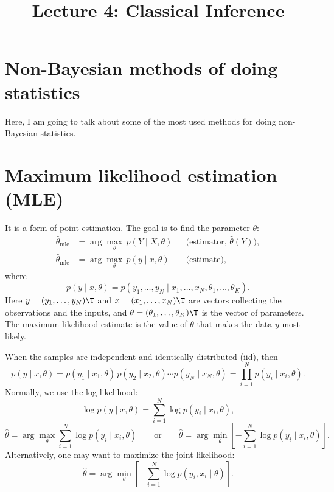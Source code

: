 
\title{Lecture 4: Classical Inference}
\author{}\date{}


\maketitle

\section*{Non-Bayesian methods of doing statistics}
Here, I am going to talk about some of the most used methods for doing non-Bayesian statistics.

\section{Maximum likelihood estimation (MLE)}
It is a form of point estimation. The goal is to find the parameter $\theta$:
\begin{align*}
\hat\theta_{\text{mle}} &= \arg\max_{\theta}\, p(Y \mid X, \theta) && \text{(estimator, } \hat\theta(Y)\text{)},\\
\hat\theta_{\text{mle}} &= \arg\max_{\theta}\, p(y \mid x, \theta) && \text{(estimate)},
\end{align*}
where
\[
p(y \mid x, \theta) = p(y_1, \dots, y_N \mid x_1, \dots, x_N, \theta_1, \dots, \theta_K).
\]
Here $y = (y_1, \dots, y_N)\T$ and $x = (x_1, \dots, x_N)\T$ are vectors collecting the observations and the inputs, and $\theta = (\theta_1, \dots, \theta_K)\T$ is the vector of parameters.
The maximum likelihood estimate is the value of $\theta$ that makes the data $y$ most likely.

When the samples are independent and identically distributed (iid), then
\[
p(y \mid x, \theta) = p(y_1 \mid x_1, \theta)\,p(y_2 \mid x_2, \theta)\cdots p(y_N \mid x_N, \theta) = \prod_{i=1}^{N} p(y_i \mid x_i, \theta).
\]
Normally, we use the log-likelihood:
\[
\log p(y \mid x, \theta) = \sum_{i=1}^{N}\log p(y_i \mid x_i, \theta),
\]
\[
\hat\theta = \arg\max_{\theta}\sum_{i=1}^{N}\log p(y_i \mid x_i, \theta)
\qquad\text{or}\qquad
\hat\theta = \arg\min_{\theta}\left[-\sum_{i=1}^{N}\log p(y_i \mid x_i, \theta)\right].
\]
Alternatively, one may want to maximize the joint likelihood:
\[
\hat\theta = \arg\min_{\theta}\left[-\sum_{i=1}^{N}\log p(y_i, x_i \mid \theta)\right].
\]

